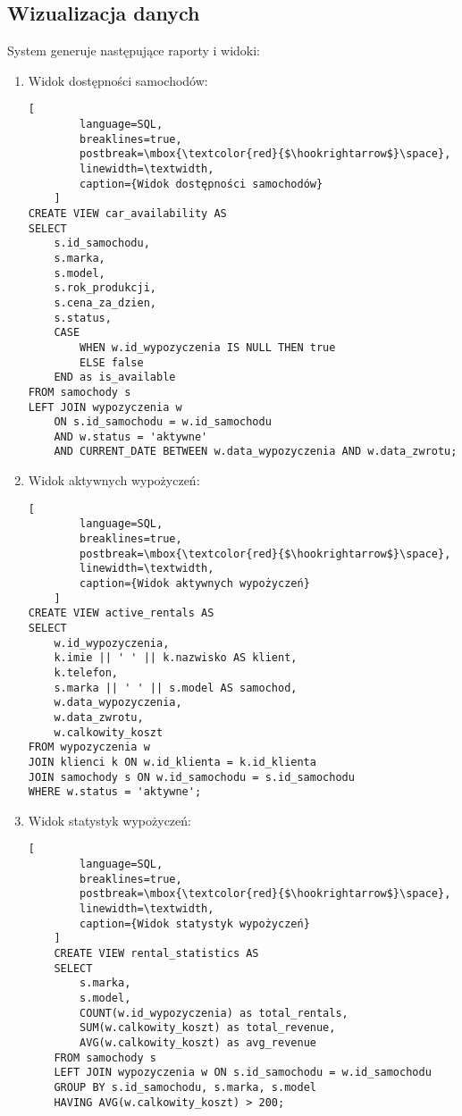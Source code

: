 \documentclass[12pt]{article}
\begin{document}
\subsection{Wizualizacja danych}
System generuje następujące raporty i widoki:

\begin{enumerate}
    \item Widok dostępności samochodów:
    \begin{lstlisting}[
        language=SQL,
        breaklines=true,
        postbreak=\mbox{\textcolor{red}{$\hookrightarrow$}\space},
        linewidth=\textwidth,
        caption={Widok dostępności samochodów}
    ]
CREATE VIEW car_availability AS
SELECT
    s.id_samochodu,
    s.marka,
    s.model,
    s.rok_produkcji,
    s.cena_za_dzien,
    s.status,
    CASE
        WHEN w.id_wypozyczenia IS NULL THEN true
        ELSE false
    END as is_available
FROM samochody s
LEFT JOIN wypozyczenia w 
    ON s.id_samochodu = w.id_samochodu
    AND w.status = 'aktywne'
    AND CURRENT_DATE BETWEEN w.data_wypozyczenia AND w.data_zwrotu;
    \end{lstlisting}
\newpage
    \item Widok aktywnych wypożyczeń:
    \begin{lstlisting}[
        language=SQL,
        breaklines=true,
        postbreak=\mbox{\textcolor{red}{$\hookrightarrow$}\space},
        linewidth=\textwidth,
        caption={Widok aktywnych wypożyczeń}
    ]
CREATE VIEW active_rentals AS
SELECT
    w.id_wypozyczenia,
    k.imie || ' ' || k.nazwisko AS klient,
    k.telefon,
    s.marka || ' ' || s.model AS samochod,
    w.data_wypozyczenia,
    w.data_zwrotu,
    w.calkowity_koszt
FROM wypozyczenia w
JOIN klienci k ON w.id_klienta = k.id_klienta
JOIN samochody s ON w.id_samochodu = s.id_samochodu
WHERE w.status = 'aktywne';
    \end{lstlisting}
    \item Widok statystyk wypożyczeń:
    \begin{lstlisting}[
        language=SQL,
        breaklines=true,
        postbreak=\mbox{\textcolor{red}{$\hookrightarrow$}\space},
        linewidth=\textwidth,
        caption={Widok statystyk wypożyczeń}
    ]
    CREATE VIEW rental_statistics AS
    SELECT
        s.marka,
        s.model,
        COUNT(w.id_wypozyczenia) as total_rentals,
        SUM(w.calkowity_koszt) as total_revenue,
        AVG(w.calkowity_koszt) as avg_revenue
    FROM samochody s
    LEFT JOIN wypozyczenia w ON s.id_samochodu = w.id_samochodu
    GROUP BY s.id_samochodu, s.marka, s.model
    HAVING AVG(w.calkowity_koszt) > 200;

    \end{lstlisting}
\end{enumerate}
\end{document}
